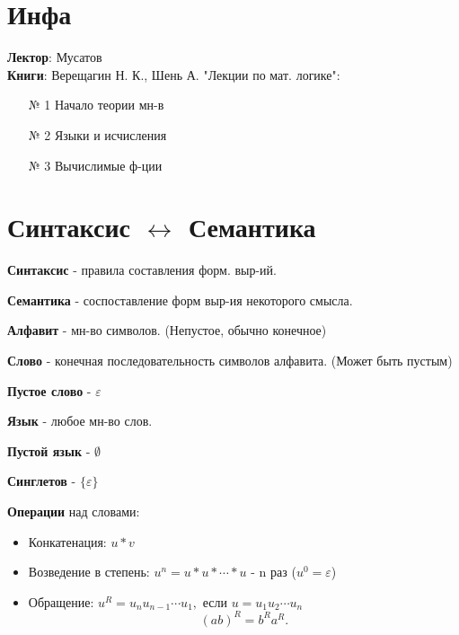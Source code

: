 
\section{Инфа}
\textbf{Лектор}: Мусатов \\
\textbf{Книги}: Верещагин Н. К., Шень А. "Лекции по мат. логике":
\begin{enumerate}
    \item [№ 1] Начало теории мн-в
    \item [№ 2] Языки и исчисления
    \item [№ 3] Вычислимые ф-ции
\end{enumerate}

\section{Синтаксис $\leftrightarrow$ Семантика}
\begin{definition}
\textbf{Синтаксис} - правила составления форм. выр-ий.
\end{definition}
\begin{definition}
\textbf{Семантика} - соспоставление форм выр-ия некоторого смысла.
\end{definition}
\begin{definition}
\textbf{Алфавит} - мн-во символов. (Непустое, обычно конечное)
\end{definition}
\begin{definition}
\textbf{Слово} - конечная последовательность символов алфавита. (Может быть пустым)

\textbf{Пустое слово} -  $\varepsilon$
\end{definition}
\begin{definition}
\textbf{Язык} - любое мн-во слов.

\textbf{Пустой язык} - $\emptyset$
 
\textbf{Синглетов} - $\{\varepsilon\}$
\end{definition}

\textbf{Операции} над словами:
\begin{itemize}
    \item Конкатенация: $u * v$
    \item Возведение в степень:  $u^{n} = u * u * \cdots * u$ - n раз ($u^{0} = \varepsilon$)
    \item Обращение: $u^{R} = u_n u_{n - 1} \cdots  u_1, \text{ если } u = u_1 u_2 \cdots u_n$
        \[
            (ab)^{R} = b^{R}a^{R}
        .\] 
\end{itemize}

